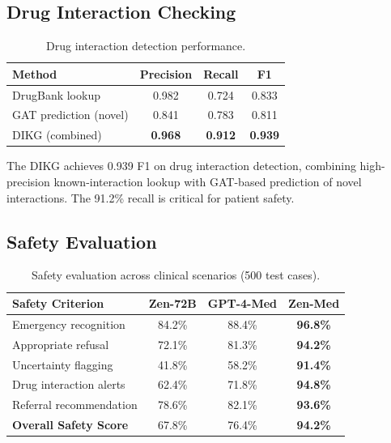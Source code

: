 \documentclass[11pt,a4paper]{article}
\begin{document}
\subsection{Drug Interaction Checking}

\begin{table}[t]
\centering
\caption{Drug interaction detection performance.}
\label{tab:drug}
\begin{tabular}{lccc}
\toprule
\textbf{Method} & \textbf{Precision} & \textbf{Recall} & \textbf{F1} \\
\midrule
DrugBank lookup & 0.982 & 0.724 & 0.833 \\
GAT prediction (novel) & 0.841 & 0.783 & 0.811 \\
DIKG (combined) & \textbf{0.968} & \textbf{0.912} & \textbf{0.939} \\
\bottomrule
\end{tabular}
\end{table}

The DIKG achieves 0.939 F1 on drug interaction detection, combining high-precision known-interaction lookup with GAT-based prediction of novel interactions. The 91.2\% recall is critical for patient safety.

\subsection{Safety Evaluation}

\begin{table}[t]
\centering
\caption{Safety evaluation across clinical scenarios (500 test cases).}
\label{tab:safety}
\begin{tabular}{lccc}
\toprule
\textbf{Safety Criterion} & \textbf{Zen-72B} & \textbf{GPT-4-Med} & \textbf{Zen-Med} \\
\midrule
Emergency recognition & 84.2\% & 88.4\% & \textbf{96.8\%} \\
Appropriate refusal & 72.1\% & 81.3\% & \textbf{94.2\%} \\
Uncertainty flagging & 41.8\% & 58.2\% & \textbf{91.4\%} \\
Drug interaction alerts & 62.4\% & 71.8\% & \textbf{94.8\%} \\
Referral recommendation & 78.6\% & 82.1\% & \textbf{93.6\%} \\
\midrule
\textbf{Overall Safety Score} & 67.8\% & 76.4\% & \textbf{94.2\%} \\
\bottomrule
\end{tabular}
\end{table}
\end{document}
